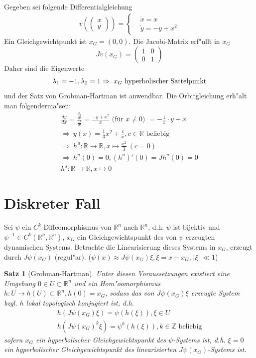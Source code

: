 \documentclass[a4paper, 13pt]{scrreprt}
\newtheorem{satz}{Satz}[section]
\theoremstyle{definition} \newtheorem{definition}{Definition}[section]
\newenvironment{beispiel}[1][Beispiel]{\begin{trivlist}
\item[\hskip \labelsep {\bfseries #1}]}{\end{trivlist}}
\begin{document}
\begin{beispiel}
Gegeben sei folgende Differentialgleichung
\begin{align*}
v( \begin{pmatrix} x \\ y\end{pmatrix} ) = \begin{cases}
&\dot{x}=x\\
&\dot{y}=-y+x^2
\end{cases}
\end{align*}
Ein Gleichgewichtpunkt ist $x_G=(0,0)$. Die Jacobi-Matrix erf"ullt in $x_G$ 
\[Jv(x_G)=\begin{pmatrix} 1&0\\ 0&1 \end{pmatrix}\]
Daher sind die Eigenwerte 
\[ \lambda_1=-1, \lambda_2=1\\
\Rightarrow\ x_G  \text{ hyperbolischer Sattelpunkt}\]
und der Satz von Grobman-Hartman ist anwendbar. Die Orbitgleichung erh"alt man folgenderma"sen:
\begin{align*}
\frac{dy}{dx}=\frac{\frac{dy}{dt}}{\frac{dx}{dt}}=\frac{-y+x^2}{x} \text{ (für $x\neq 0$) } =-\frac 1 x \cdot y+x\\
\Rightarrow\ y(x)=\frac 1 3 x^2+\frac c x, c\in\mathbb{R} \text{ beliebig} \\
\Rightarrow\ h^u:\mathbb{R}\to\mathbb{R}, x\mapsto\frac{x^2} 3\ (c=0)\\
\Rightarrow\ h^u(0)=0, (h^u)'(0)=Jh^u(0)=0\\
h^s:\mathbb{R}\to\mathbb{R}, x\mapsto 0
\end{align*}
\end{beispiel}


\section{Diskreter Fall}
Sei $\psi$ ein $C^k$-Diffeomorphismus von $\mathbb{R}^n$ nach $\mathbb{R}^n$, d.h. $\psi$ ist bijektiv und $\psi^{-1}\in C^k(\mathbb{R}^{n},\mathbb{R}^{n})$, $x_G$ ein Gleichgewichtspunkt des von $\psi$ erzeugten dynamischen Systems. Betrachte die Linearisierung dieses Systems in $x_G$, erzeugt durch $J\psi(x_G)$ (regul"ar). ($\psi(x)\approx J\psi(x_G)\xi, \xi=x-x_G, \Vert\xi\Vert\ll 1$)

\begin{satz}[Grobman-Hartman]
Unter diesen Voraussetzungen existiert eine Umgebung $0\in U\subset \mathbb{R}^n$ und ein Hom"oomorphismus $h:U\to h(U)\subset\mathbb{R}^n, h(0)=x_G$, sodass das von $J\psi(x_G)\xi$ erzeugte System bzgl. $h$ lokal topologisch konjugiert ist, d.h.
\begin{align*}
h(J\psi(x_G)\xi)=\psi(h(\xi)), \xi\in U\\
h(J\psi(x_G)^k\xi)=\psi^k(h(\xi)), k\in\mathbb{Z} \text{ beliebig}
\end{align*}
sofern $x_G$ ein hyperbolischer Gleichgewichtspunkt des $\psi$-Systems ist, d.h. $\xi=0$ ein hyperbolischer Gleichgewichtspunkt des linearisierten $J\psi(x_G)$-Systems ist.
\end{satz}
\end{document}
